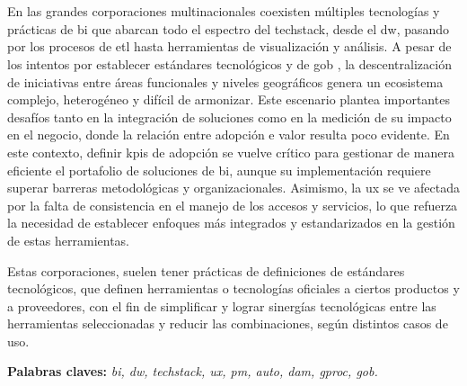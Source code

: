 \chapter*{\runtitulo}

\noindent 

En las grandes corporaciones multinacionales coexisten múltiples tecnologías y prácticas de \gls{bi} que abarcan todo el espectro del \gls{techstack}, desde el \gls{dw}, pasando por los procesos de \gls{etl} \cite{inmon1992} hasta herramientas de visualización y análisis. A pesar de los intentos por establecer estándares tecnológicos y de \Gls{gob} \cite{isaca2012}, la descentralización de iniciativas entre áreas funcionales y niveles geográficos genera un ecosistema complejo, heterogéneo y difícil de armonizar. Este escenario plantea importantes desafíos tanto en la integración de soluciones como en la medición de su impacto en el negocio, donde la relación entre adopción e valor resulta poco evidente\cite{davenport2006}. En este contexto, definir \glspl{kpi} de adopción se vuelve crítico para gestionar de manera eficiente el portafolio de soluciones de \gls{bi}, aunque su implementación requiere superar barreras metodológicas y organizacionales. Asimismo, la \gls{ux} se ve afectada por la falta de consistencia en el manejo de los accesos y servicios, lo que refuerza la necesidad de establecer enfoques más integrados y estandarizados en la gestión de estas herramientas.

Estas corporaciones, suelen tener prácticas de definiciones de estándares tecnológicos, que definen herramientas o tecnologías oficiales a ciertos productos y a proveedores, con el fin de simplificar y lograr sinergías tecnológicas entre las herramientas seleccionadas y reducir las combinaciones, según distintos casos de uso\cite{jacobson1986}.

\bigskip

\noindent\textbf{Palabras claves:} \emph{\gls{bi}, \gls{dw}, \Gls{techstack}, \Gls{ux},  \Gls{pm}, \Gls{auto}, \Gls{dam}, \Gls{gproc}, \Gls{gob}.}


